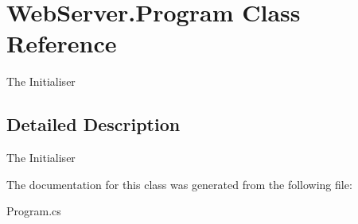 \hypertarget{class_web_server_1_1_program}{}\section{Web\+Server.\+Program Class Reference}
\label{class_web_server_1_1_program}


The Initialiser  




\subsection{Detailed Description}
The Initialiser 



The documentation for this class was generated from the following file\+:\begin{DoxyCompactItemize}
\item 
Program.\+cs\end{DoxyCompactItemize}
